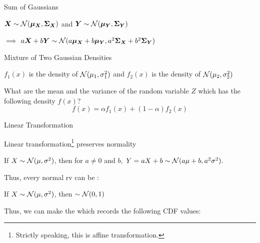 \documentclass[handout,fleqn,aspectratio=169]{beamer}
\begin{document}
\begin{frame}{Sum of Gaussians}

\plitemsep 0.5in
\bci 
\item $\bm{X} \sim \mathcal N(\bm{\mu}_{\bm{X}}, \bm{\Sigma}_{\bm{X}})$ and $\bm{Y} \sim \mathcal N(\bm{\mu}_{\bm{Y}}, \bm{\Sigma}_{\bm{Y}})$

\item[$\implies$] $a\bm{X} + b\bm{Y} \sim \mathcal N(a\bm{\mu}_{\bm{X}} + b\bm{\mu}_{\bm{Y}}, a^2\bm{\Sigma}_{\bm{X}} + b^2\bm{\Sigma}_{\bm{Y}})$


\eci
\end{frame}

\begin{frame}{Mixture of Two Gaussian Densities}

\plitemsep 0.1in
\bci 
\item $f_1(x)$ is the density of $\mathcal N(\mu_1,\sigma_1^2)$ and $f_2(x)$ is the density of $\mathcal N(\mu_2,\sigma_2^2)$


\item \question What are the mean and the variance of the random variable $Z$ which has the following density $f(x)$?
$$
f(x) = \alpha f_1(x) + (1-\alpha)f_2(x)
$$

\eci
\end{frame}

\begin{frame}{Linear Transformation}

\plitemsep 0.1in
\bci 
\item<2-> Linear transformation\footnote{Strictly speaking, this is affine transformation.} preserves normality

{
If $X \sim  \mathcal N(\mu, \sigma^2) $, then for $a \neq 0$ and $b,$ $Y = aX +b \sim \mathcal N(a\mu +b,a^2 \sigma^2).$ 
}

\item<3-> Thus, every normal rv can be : 

If $X \sim  \mathcal N(\mu, \sigma^2)$, then 
 $\sim \mathcal N(0,1)$

\item<5-> Thus, we can make the  which records the following CDF values:

\eci
\end{frame}
\end{document}
